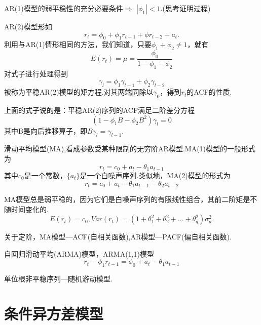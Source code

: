 \documentclass[UTF8]{ctexart}
\begin{document}
\hspace*{\fill}

AR(1)模型的弱平稳性的充分必要条件$\Longrightarrow$ $|\phi_1|<1$.(思考证明过程)

\hspace*{\fill}

AR(2)模型形如\[r_t=\phi_0+\phi_1 r_{t-1}+\phi r_{t-2}+a_t.\]利用与AR(1)情形相同的方法，我们知道，只要$\phi_1+\phi_2 \neq 1$，就有\[E(r_t)=\mu=\dfrac{\phi_0}{1-\phi_1-\phi_2}\]对式子进行处理得到\[\gamma_l = \phi_1 \gamma_{l-1}+\phi_2 \gamma_{l-2}\]被称为平稳AR(2)模型的矩方程.对其两端同除以$\gamma_0$，得到$r_t$的ACF的性质.

\hspace*{\fill}

上面的式子说的是：平稳AR(2)序列的ACF满足二阶差分方程\[(1-\phi_1 B-\phi_2 B^2)\gamma_l=0\]其中B是向后推移算子，即$B\gamma_l = \gamma_{l-1}$.

\hspace*{\fill}

滑动平均模型(MA),看成参数受某种限制的无穷阶AR模型.MA(1)模型的一般形式为\[r_t=c_0+a_t-\theta_1 a_{t-1}\]其中$c_0$是一个常数，$\{a_t\}$是一个白噪声序列.类似地，MA(2)模型的形式为\[r_t=c_0+a_t-\theta_1 a_{t-1}-\theta_2 a_{t-2}\]

\hspace*{\fill}

MA模型总是弱平稳的，因为它们是白噪声序列的有限线性组合，其前二阶矩是不随时间变化的.\[E(r_t)=c_0,Var(r_t)=(1+\theta_1^2+\theta_2^2+...+\theta_q^2)\sigma_a^2.\]

\hspace*{\fill}

关于定阶，MA模型---ACF(自相关函数),AR模型---PACF(偏自相关函数).

\hspace*{\fill}

自回归滑动平均(ARMA)模型，ARMA(1,1)模型\[r_t-\phi_1 r_{t-1}=\phi_0+a_t-\theta_1 a_{t-1}\]

\hspace*{\fill}

单位根非平稳序列---随机游动模型.

\hspace*{\fill}





\section{条件异方差模型}
\end{document}
